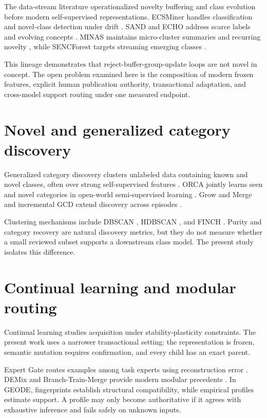 \documentclass[12pt,oneside]{report}
\newcommand{\systemname}{GEODE}
\begin{document}
The data-stream literature operationalized novelty buffering and class
evolution before modern self-supervised representations. ECSMiner handles
classification and novel-class detection under drift \cite{masud2011}. SAND
and ECHO address scarce labels and evolving concepts
\cite{haque2016sand,haque2016echo}. MINAS maintains micro-cluster summaries
and recurring novelty \cite{faria2016}, while SENCForest targets streaming
emerging classes \cite{mu2017}.

This lineage demonstrates that reject-buffer-group-update loops are not novel
in concept. The open problem examined here is the composition of modern frozen
features, explicit human publication authority, transactional adaptation, and
cross-model support routing under one measured endpoint.

\section{Novel and generalized category discovery}

Generalized category discovery clusters unlabeled data containing known and
novel classes, often over strong self-supervised features \cite{vaze2022}.
ORCA jointly learns seen and novel categories in open-world semi-supervised
learning \cite{cao2022}. Grow and Merge and incremental GCD extend discovery
across episodes \cite{zhang2022,zhao2023}.

Clustering mechanisms include DBSCAN \cite{ester1996}, HDBSCAN
\cite{campello2013}, and FINCH \cite{sarfraz2019}. Purity and category recovery
are natural discovery metrics, but they do not measure whether a small reviewed
subset supports a downstream class model. The present study isolates this
difference.

\section{Continual learning and modular routing}

Continual learning studies acquisition under stability-plasticity constraints.
The present work uses a narrower transactional setting: the representation is
frozen, semantic mutation requires confirmation, and every child has an exact
parent.

Expert Gate routes examples among task experts using reconstruction error
\cite{aljundi2017}. DEMix and Branch-Train-Merge provide modern modular
precedents \cite{gururangan2021,li2022}. In \systemname, fingerprints establish
structural compatibility, while empirical profiles estimate support. A
profile may only become authoritative if it agrees with exhaustive inference
and fails safely on unknown inputs.
\end{document}
